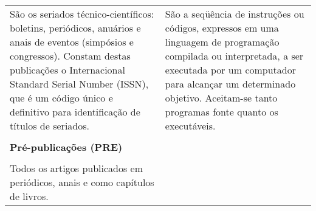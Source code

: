 \begin{table}
\begin{center}
\begin{tabularx}{\textwidth}{>{\raggedright\arraybackslash}X >{\raggedright\arraybackslash}X}
\\
São os seriados técnico-científicos: boletins, periódicos, anuários e anais de eventos (simpósios e congressos). Constam destas publicações o Internacional Standard Serial Number (ISSN), que é um código único e definitivo para identificação de títulos de seriados. 
&	
São a seqüência de instruções ou códigos, expressos em uma linguagem de programação compilada ou interpretada, a ser executada por um computador para alcançar um determinado objetivo. Aceitam-se tanto programas fonte quanto os executáveis.\\
\\
\textbf{Pré-publicações (PRE)} \\
\\
Todos os artigos publicados em  periódicos, anais e como capítulos de livros.    \end{tabularx}
\end{center}
\end{table}

